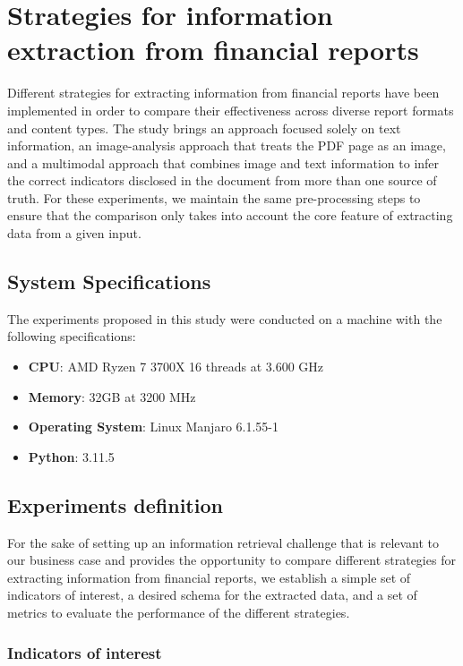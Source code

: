 \documentclass[english, 12pt, a4paper, elec, utf8, a-2b, online]{aaltothesis}
\begin{document}
\clearpage

\section{Strategies for information extraction from financial reports}

Different strategies for extracting information from financial reports have been implemented in order to compare their effectiveness across diverse report formats and content types.
The study brings an approach focused solely on text information, an image-analysis approach that treats the PDF page as an image, and a multimodal approach that combines image and text information to infer the correct indicators disclosed in the document from more than one source of truth.
For these experiments, we maintain the same pre-processing steps to ensure that the comparison only takes into account the core feature of extracting data from a given input.

\subsection{System Specifications}

The experiments proposed in this study were conducted on a machine with the following specifications:

\begin{itemize}
    \item \textbf{CPU}: AMD Ryzen 7 3700X 16 threads at 3.600 GHz
    \item \textbf{Memory}: 32GB at 3200 MHz
    \item \textbf{Operating System}: Linux Manjaro 6.1.55-1
    \item \textbf{Python}: 3.11.5
\end{itemize}

\subsection{Experiments definition}

For the sake of setting up an information retrieval challenge that is relevant to our business case and provides the opportunity to compare different strategies for extracting information from financial reports, we establish a simple set of indicators of interest, a desired schema for the extracted data, and a set of metrics to evaluate the performance of the different strategies.

\subsubsection{Indicators of interest}
\end{document}
